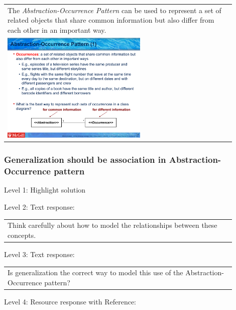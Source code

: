 \begin{tabular}{|p{0.9\linewidth}}
The \textit{Abstraction-Occurrence Pattern} can be used to 
represent a set of related objects that share common information but also differ
from each other in an important way.

\\
\includegraphics[width=0.6\textwidth]{images/abstraction_occurrence.png}
\end{tabular} \medskip


\subsubsection{Generalization should be association in Abstraction-Occurrence pattern}

\noindent Level 1: Highlight solution  \medskip

\noindent Level 2: Text response: \medskip

\begin{tabular}{|p{0.9\linewidth}}
Think carefully about how to model the relationships between these concepts.
\end{tabular} \medskip

\noindent Level 3: Text response: \medskip

\begin{tabular}{|p{0.9\linewidth}}
Is generalization the correct way to model this use of the Abstraction-Occurrence pattern?
\end{tabular} \medskip

\noindent Level 4: Resource response with Reference: \medskip

